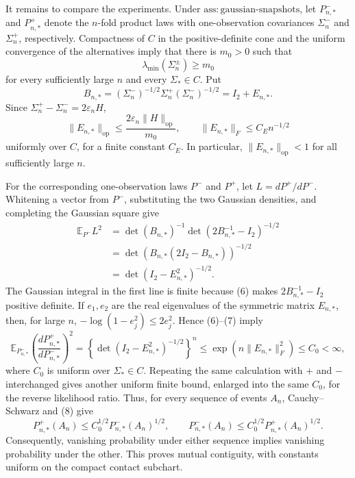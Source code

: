 It remains to compare the experiments.  Under \(\mathrm{ass:gaussian\text{-}snapshots}\), let \(P_{n,*}^-\) and \(P_{n,*}^+\) denote the \(n\)-fold product laws with one-observation covariances \(\Sigma_n^-\) and \(\Sigma_n^+\), respectively.  Compactness of \(C\) in the positive-definite cone and the uniform convergence of the alternatives imply that there is \(m_0>0\) such that
\[
 \lambda_{\min}(\Sigma_n^\pm)\ge m_0
\]
for every sufficiently large \(n\) and every \(\Sigma_*\in C\).  Put
\[
 B_{n,*}=(\Sigma_n^-)^{-1/2}\Sigma_n^+(\Sigma_n^-)^{-1/2}
 =I_2+E_{n,*}.
\]
Since \(\Sigma_n^+-\Sigma_n^-=2\varepsilon_nH\),
\[
 \|E_{n,*}\|_{\mathrm{op}}
 \le \frac{2\varepsilon_n\|H\|_{\mathrm{op}}}{m_0},
 \qquad
 \|E_{n,*}\|_F\le C_E n^{-1/2} \tag{6}
\]
uniformly over \(C\), for a finite constant \(C_E\).  In particular,
\(\|E_{n,*}\|_{\mathrm{op}}<1\) for all sufficiently large \(n\).

For the corresponding one-observation laws \(P^-\) and \(P^+\), let
\(L=dP^+/dP^-\).  Whitening a vector from \(P^-\), substituting the two Gaussian densities, and completing the Gaussian square give
\[
 \begin{aligned}
 \mathbb E_{P^-}L^2
 &=\det(B_{n,*})^{-1}
   \det(2B_{n,*}^{-1}-I_2)^{-1/2}\\
 &=\det\!\left(B_{n,*}(2I_2-B_{n,*})\right)^{-1/2}\\
 &=\det(I_2-E_{n,*}^2)^{-1/2}. 
 \end{aligned} \tag{7}
\]
The Gaussian integral in the first line is finite because (6) makes
\(2B_{n,*}^{-1}-I_2\) positive definite.  If \(e_1,e_2\) are the real eigenvalues of the symmetric matrix \(E_{n,*}\), then, for large \(n\),
\(-\log(1-e_j^2)\le2e_j^2\).  Hence (6)--(7) imply
\[
 \mathbb E_{P_{n,*}^-}
 \left(\frac{dP_{n,*}^+}{dP_{n,*}^-}\right)^2
 =\left\{\det(I_2-E_{n,*}^2)^{-1/2}\right\}^{n}
 \le \exp\!\left(n\|E_{n,*}\|_F^2\right)
 \le C_0<\infty, \tag{8}
\]
where \(C_0\) is uniform over \(\Sigma_*\in C\).  Repeating the same calculation with \(+\) and \(-\) interchanged gives another uniform finite bound, enlarged into the same \(C_0\), for the reverse likelihood ratio.  Thus, for every sequence of events \(A_n\), Cauchy--Schwarz and (8) give
\[
 P_{n,*}^+(A_n)\le C_0^{1/2}P_{n,*}^-(A_n)^{1/2},
 \qquad
 P_{n,*}^-(A_n)\le C_0^{1/2}P_{n,*}^+(A_n)^{1/2}. \tag{9}
\]
Consequently, vanishing probability under either sequence implies vanishing probability under the other.  This proves mutual contiguity, with constants uniform on the compact contact subchart.

